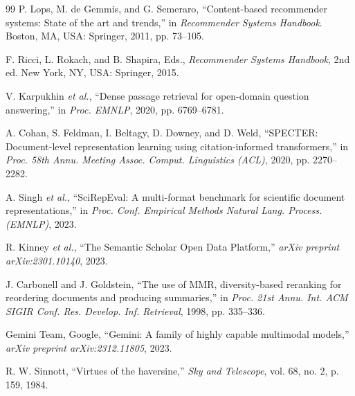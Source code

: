 \documentclass[conference]{IEEEtran}
\begin{document}
\begin{thebibliography}{99}
P. Lops, M. de Gemmis, and G. Semeraro, ``Content-based recommender systems: State of the art and trends,'' in \textit{Recommender Systems Handbook}. Boston, MA, USA: Springer, 2011, pp. 73--105.

F. Ricci, L. Rokach, and B. Shapira, Eds., \textit{Recommender Systems Handbook}, 2nd ed. New York, NY, USA: Springer, 2015.

V. Karpukhin \textit{et al.}, ``Dense passage retrieval for open-domain question answering,'' in \textit{Proc. EMNLP}, 2020, pp. 6769--6781.

A. Cohan, S. Feldman, I. Beltagy, D. Downey, and D. Weld, ``SPECTER: Document-level representation learning using citation-informed transformers,'' in \textit{Proc. 58th Annu. Meeting Assoc. Comput. Linguistics (ACL)}, 2020, pp. 2270--2282.

A. Singh \textit{et al.}, ``SciRepEval: A multi-format benchmark for scientific document representations,'' in \textit{Proc. Conf. Empirical Methods Natural Lang. Process. (EMNLP)}, 2023.

R. Kinney \textit{et al.}, ``The Semantic Scholar Open Data Platform,'' \textit{arXiv preprint arXiv:2301.10140}, 2023.

J. Carbonell and J. Goldstein, ``The use of MMR, diversity-based reranking for reordering documents and producing summaries,'' in \textit{Proc. 21st Annu. Int. ACM SIGIR Conf. Res. Develop. Inf. Retrieval}, 1998, pp. 335--336.

Gemini Team, Google, ``Gemini: A family of highly capable multimodal models,'' \textit{arXiv preprint arXiv:2312.11805}, 2023.

R. W. Sinnott, ``Virtues of the haversine,'' \textit{Sky and Telescope}, vol. 68, no. 2, p. 159, 1984.
\end{thebibliography}
\end{document}
